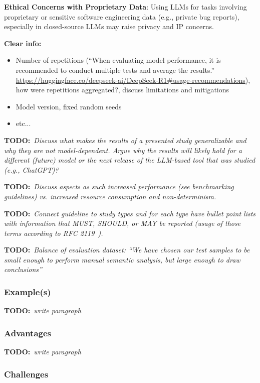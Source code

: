 \documentclass[11pt]{article}
\newcommand{\todo}[1]{{\textbf{TODO:}\ \textit{#1}}} %
\begin{document}
\textbf{Ethical Concerns with Proprietary Data}:
Using LLMs for tasks involving proprietary or sensitive software engineering data (e.g., private bug reports), especially in closed-source LLMs may raise privacy and IP concerns.

\textbf{Clear info:} 
\begin{itemize}
  \item Number of repetitions (``When evaluating model performance, it is recommended to conduct multiple tests and average the results.'' \url{https://huggingface.co/deepseek-ai/DeepSeek-R1\#usage-recommendations}), how were repetitions aggregated?, discuss limitations and mitigations
  \item Model version, fixed random seeds
  \item etc...
\end{itemize}

\todo{Discuss what makes the results of a presented study generalizable and why they are not model-dependent. Argue why the results will likely hold for a different (future) model or the next release of the LLM-based tool that was studied (e.g., ChatGPT)?}

\todo{Discuss aspects as such increased performance (see benchmarking guidelines) vs. increased resource consumption and non-determinism.}

\todo{Connect guideline to study types and for each type have bullet point lists with information that MUST, SHOULD, or MAY be reported (usage of those terms according to RFC 2119~\cite{rfc2119}).}

\todo{Balance of evaluation dataset: ``We have chosen our test samples to be small enough to perform manual semantic analysis, but large enough to draw conclusions''~\cite{tinnessoftware}}


\subsubsection{Example(s)}

\todo{write paragraph}


\subsubsection{Advantages}

\todo{write paragraph}


\subsubsection{Challenges}
\end{document}
